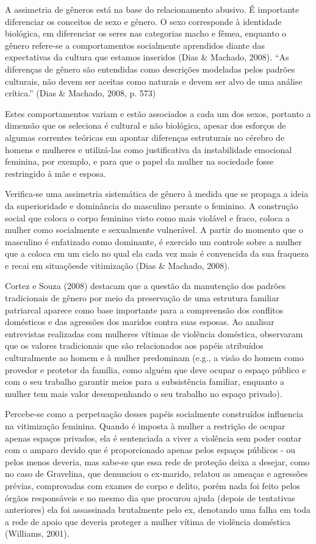A assimetria de gêneros está na base do relacionamento abusivo. É importante diferenciar os conceitos de sexo e gênero. O sexo corresponde à identidade biológica, em diferenciar os seres nas categorias macho e fêmea, enquanto o gênero refere-se a comportamentos socialmente aprendidos diante das expectativas da cultura que estamos inseridos (Dias \& Machado, 2008). “As diferenças de gênero são entendidas como descrições modeladas pelos padrões culturais, não devem ser aceitas como naturais e devem ser alvo de uma análise crítica.” (Dias \& Machado, 2008, p. 573) 

Estes comportamentos variam e estão associados a cada um dos sexos, portanto a dimensão que os seleciona é cultural e não biológica, apesar dos esforços de algumas correntes teóricas em apontar diferenças estruturais no cérebro de homens e mulheres e utilizá-las como justificativa da instabilidade emocional feminina, por exemplo, e para que o papel da mulher na sociedade fosse restringido à mãe e esposa.

Verifica-se uma assimetria sistemática de gênero à medida que se propaga a ideia da superioridade e dominância do masculino perante o feminino. A construção social que coloca o corpo feminino visto como mais violável e fraco, coloca a mulher como socialmente e sexualmente vulnerável. A partir do momento que o masculino é enfatizado como dominante, é exercido um controle sobre a mulher que a coloca em um ciclo no qual ela cada vez mais é convencida da sua fraqueza e recai em situaçõesde vitimização (Dias \& Machado, 2008).

Cortez e Souza (2008) destacam que a questão da manutenção dos padrões tradicionais de gênero por meio da preservação de uma estrutura familiar patriarcal aparece como base importante para a compreensão dos conflitos domésticos e das agressões dos maridos contra suas esposas. Ao analisar entrevistas realizadas com mulheres vítimas de violência doméstica, observaram que os valores tradicionais que são relacionados aos papéis atribuídos culturalmente ao homem e à mulher predominam (e.g., a visão do homem como provedor e protetor da família, como alguém que deve ocupar o espaço público e com o seu trabalho garantir meios para a subsistência familiar, enquanto a mulher tem mais valor desempenhando o seu trabalho no espaço privado).

Percebe-se como a perpetuação desses papéis socialmente construídos influencia na vitimização feminina. Quando é imposta à mulher a restrição de ocupar apenas espaços privados, ela é sentenciada a viver a violência sem poder contar com o amparo devido que é proporcionado apenas pelos espaços públicos - ou pelos menos deveria, mas sabe-se que essa rede de proteção deixa a desejar, como no caso de Gravelina, que denunciou o ex-marido, relatou as ameaças e agressões prévias, comprovadas com exames de corpo e delito, porém nada foi feito pelos órgãos responsáveis e no mesmo dia que procurou ajuda (depois de tentativas anteriores) ela foi assassinada brutalmente pelo ex, denotando uma falha em toda a rede de apoio que deveria proteger a mulher vítima de violência doméstica (Williams, 2001).

